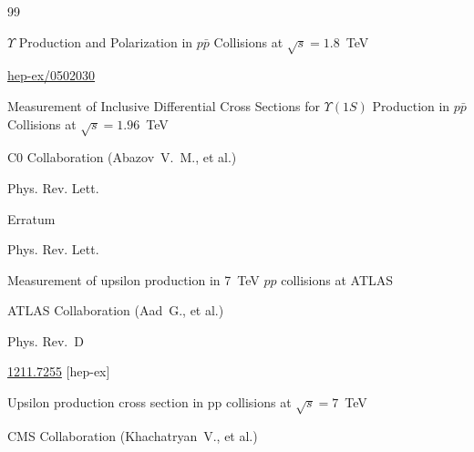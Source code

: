 \begin{thebibliography}{99}



\paper $\Upsilon$ Production and Polarization in $p \bar p$ Collisions at $\sqrt s=1.8$~TeV







\arxiv \href{http://arxiv.org/abs/hep-ex/0502030}{hep-ex/0502030}

\paper Measurement of Inclusive Differential Cross Sections for $\Upsilon (1S)$ Production in $p\bar p$ Collisions at $\sqrt s =1.96$~TeV

\by   C0 Collaboration (Abazov~V.~M., et al.)

\jour Phys. Rev.  Lett.





\moreref

\paper Erratum 

\jour Phys. Rev. Lett.









\paper Measurement of upsilon production in 7~TeV $pp$ collisions at ATLAS

\by ATLAS Collaboration (Aad~G., et al.)

\jour Phys. Rev.~D 





\arxiv \href{http://arxiv.org/abs/1211.7255}{1211.7255} [hep-ex]




\paper Upsilon production cross section in pp collisions at $\sqrt s =7$~TeV

\by CMS Collaboration (Khachatryan~V., et al.)


\end{thebibliography}
